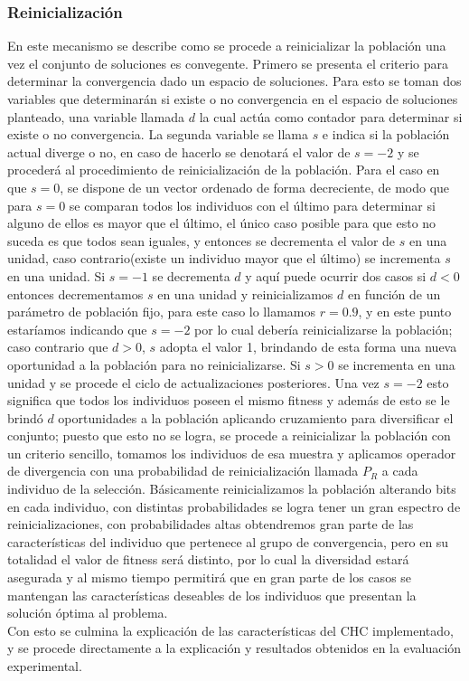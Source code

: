 \documentclass[journal]{IEEEtran}
\begin{document}
\subsubsection{Reinicialización}
En este mecanismo se describe como se procede a reinicializar la población una vez el conjunto de soluciones es convegente. Primero se presenta el criterio para determinar la convergencia dado un espacio de soluciones.
Para esto se toman dos variables que determinarán si existe o no convergencia en el espacio de soluciones planteado, una variable llamada $d$ la cual actúa como contador para determinar si existe o no convergencia. La segunda variable se llama $s$ e indica si la población actual diverge o no, en caso de hacerlo se denotará el valor de $s=-2$ y se procederá al procedimiento de reinicialización de la población. Para el caso en que $s=0$, se dispone de un vector ordenado de forma decreciente, de modo que para $s=0$ se comparan todos los individuos con el último para determinar si alguno de ellos es mayor que el último, el único caso posible para que esto no suceda es que todos sean iguales, y entonces se decrementa el valor de $s$ en una unidad, caso contrario(existe un individuo mayor que el último) se incrementa $s$ en una unidad. Si $s=-1$ se decrementa $d$ y aquí puede ocurrir dos casos si $d<0$ entonces decrementamos $s$ en una unidad y reinicializamos $d$ en función de un parámetro de población fijo, para este caso lo llamamos $r=0.9$, y en este punto estaríamos indicando que $s=-2$ por lo cual debería reinicializarse la población; caso contrario que $d>0$, $s$ adopta el valor 1, brindando de esta forma una nueva oportunidad a la población para no reinicializarse. Si $s>0$ se incrementa en una unidad y se procede el ciclo de actualizaciones posteriores.
Una vez $s=-2$ esto significa que todos los individuos poseen el mismo fitness y además de esto se le brindó $d$ oportunidades a la población aplicando cruzamiento para diversificar el conjunto; puesto que esto no se logra, se procede a reinicializar la población con un criterio sencillo, tomamos los individuos de esa muestra y aplicamos operador de divergencia con una probabilidad de reinicialización llamada $P_{R}$ a cada individuo de la selección. Básicamente reinicializamos la población alterando bits en cada individuo, con distintas probabilidades se logra tener un gran espectro de reinicializaciones, con probabilidades altas obtendremos gran parte de las características del individuo que pertenece al grupo de convergencia, pero en su totalidad el valor de fitness será distinto, por lo cual la diversidad estará asegurada y al mismo tiempo permitirá que en gran parte de los casos se mantengan las características deseables de los individuos que presentan la solución óptima al problema.
\\
Con esto se culmina la explicación de las características del CHC implementado, y se procede directamente a la explicación y resultados obtenidos en la evaluación experimental.
\end{document}
